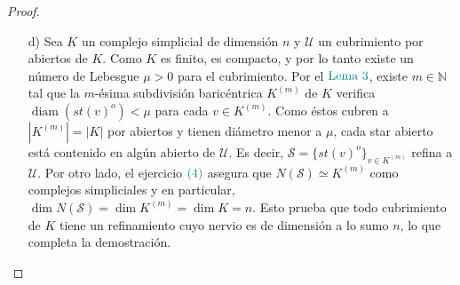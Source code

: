 \documentclass[11pt]{article}
\newcommand{\R}{\mathbb{R}}
\newcommand{\tint}[1]{#1^o}%
\newcommand{\diam}[1]{\operatorname{diam}(#1)}
\newcommand{\paint}[2]{\color{#1}{#2}}
\begin{document}
\begin{proof}
\begin{itemize}
Afirmamos ahora que $N(\mathcal{O})$ es de dimensi\'on a lo sumo $1$, o equivalentemente, que no hay tres intervalos de $\mathcal{O}$ cuya intersecci\'on sea no vac\'ia. Supongamos que s\'i y sean $\{J_i\}_{1 \leq i \leq 3} \subset \mathcal{O}$ de intersecci\'on no vac\'ia y tales que el interior de $J_i$ en $\R$ es $(a_i,b_i)$\footnote[1]{Esto evita tratar por separado la posible elecci\'on de $E_0$ o $E_1$, ya que al ser los \'unicos dos intervalos semiabiertos, el argumento que sigue funciona a\'un si $a_1 \in J_1$ o $b_3 \in J_3$. Siempre tenemos que tanto $J_2$ como $J_1 \cap J_3$ son intervalos abiertos, y no hace falta que las desigualdades entre $a_1$ y $a_2$ o $b_2$ y $b_3$ sean estrictas.}. Como los intervalos no se contienen entre s\'i, existen dos de ellos distintos con el menor extremo izquierdo y mayor extremo derecho, que suponemos son $J_1$ y $J_3$ respectivamente. As\'i, $J_1 \cap J_3 = (a_3,b_1)$. Como $J_2 \not \subseteq J_1$ debe ser $b_2 > b_1$, y similarmente como $J_2 \not \subseteq J_3$ tenemos que $a_2 < a_3$. Si ahora $s \in J_2$, entonces $a_1 \leq a_2 < s < b_2 \leq b_3$. Si $s \not \in J_1$, luego $s > b_1 > a_3$ y consecuentemente $s \in J_3$. En cualquier caso, $s \in J_1 \cup J_3$. Esto implica que $J_2 \subset J_1 \cap J_3$, lo que es absurdo: no hay entonces tres intervalos cuya intersecci\'on sea no vac\'ia. Dado un cubrimiento arbitrario encontramos un refinamiento cuyo nervio es de dimensi\'on a lo sumo $1$, lo que completa la demostraci\'on. 
\item[d)] Sea $K$ un complejo simplicial de dimensi\'on $n$ y $\mathcal{U}$ un cubrimiento por abiertos de $K$. Como $K$ es finito, es compacto, y por lo tanto existe un n\'umero de Lebesgue $\mu > 0$ para el cubrimiento. Por el $\paint{grey-light-blue}{\text{Lema }3}$, existe $m \in \mathbb{N}$ tal que la $m$-\'esima subdivisi\'on baric\'entrica $K^{(m)}$ de $K$ verifica $\diam{\tint{st(v)}} < \mu$ para cada $v \in K^{(m)}$. Como \'estos cubren a $|K^{(m)}| = |K|$ por abiertos y tienen di\'ametro menor a $\mu$, cada star abierto est\'a contenido en alg\'un abierto de $\mathcal{U}$. Es decir, $\mathcal{S} = \{\tint{st(v)}\}_{v \in K^{(m)}}$ refina a $\mathcal{U}$. Por otro lado, el ejercicio $\paint{grey-light-blue}{(4)}$ asegura que $N(\mathcal{S}) \simeq K^{(m)}$ como complejos simpliciales y en particular, $\dim N(\mathcal{S}) = \dim K^{(m)} = \dim K = n$. Esto prueba que todo cubrimiento de $K$ tiene un refinamiento cuyo nervio es de dimensi\'on a lo sumo $n$, lo que completa la demostraci\'on.
\end{itemize}
\end{proof}
\end{document}
